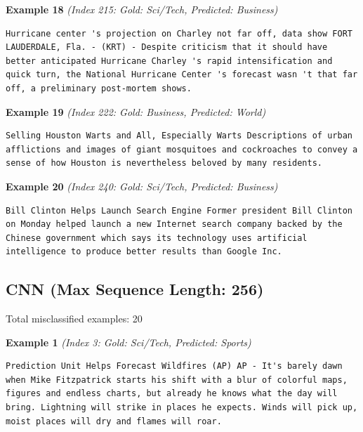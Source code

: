 \noindent
\textbf{Example 18} \quad \textit{(Index 215: Gold: Sci/Tech, Predicted: Business)}

\begin{Verbatim}[breaklines=true,breakanywhere=true,fontsize=\small]
Hurricane center 's projection on Charley not far off, data show FORT LAUDERDALE, Fla. - (KRT) - Despite criticism that it should have better anticipated Hurricane Charley 's rapid intensification and quick turn, the National Hurricane Center 's forecast wasn 't that far off, a preliminary post-mortem shows.
\end{Verbatim}

\noindent
\textbf{Example 19} \quad \textit{(Index 222: Gold: Business, Predicted: World)}

\begin{Verbatim}[breaklines=true,breakanywhere=true,fontsize=\small]
Selling Houston Warts and All, Especially Warts Descriptions of urban afflictions and images of giant mosquitoes and cockroaches to convey a sense of how Houston is nevertheless beloved by many residents.
\end{Verbatim}

\noindent
\textbf{Example 20} \quad \textit{(Index 240: Gold: Sci/Tech, Predicted: Business)}

\begin{Verbatim}[breaklines=true,breakanywhere=true,fontsize=\small]
Bill Clinton Helps Launch Search Engine Former president Bill Clinton on Monday helped launch a new Internet search company backed by the Chinese government which says its technology uses artificial intelligence to produce better results than Google Inc.
\end{Verbatim}

\subsection{CNN (Max Sequence Length: 256)}
\label{app:run3}

Total misclassified examples: 20

\noindent
\textbf{Example 1} \quad \textit{(Index 3: Gold: Sci/Tech, Predicted: Sports)}

\begin{Verbatim}[breaklines=true,breakanywhere=true,fontsize=\small]
Prediction Unit Helps Forecast Wildfires (AP) AP - It's barely dawn when Mike Fitzpatrick starts his shift with a blur of colorful maps, figures and endless charts, but already he knows what the day will bring. Lightning will strike in places he expects. Winds will pick up, moist places will dry and flames will roar.
\end{Verbatim}

